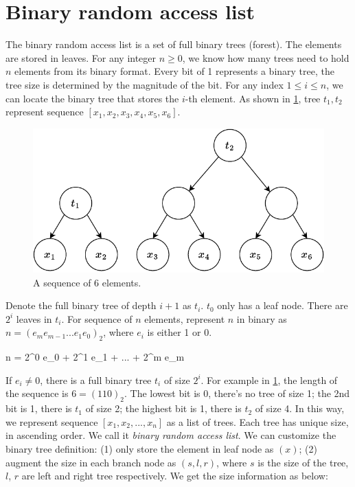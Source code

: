 \documentclass[b5paper]{article}
\begin{document}
\section{Binary random access list}

The binary random access list is a set of full binary trees (forest). The elements are stored in leaves. For any integer $n \geq 0$, we know how many trees need to hold $n$ elements from its binary format. Every bit of 1 represents a binary tree, the tree size is determined by the magnitude of the bit. For any index $1 \leq i \leq n$, we can locate the binary tree that stores the $i$-th element. As shown in \cref{fig:bi-tree-sequence}, tree $t_1, t_2$ represent sequence $[x_1, x_2, x_3, x_4, x_5, x_6]$.

\begin{figure}[htbp]
  \centering
  \includegraphics[scale=0.6]{img/bi-tree-sequence}
  \caption{A sequence of 6 elements.}
  \label{fig:bi-tree-sequence}
\end{figure}

Denote the full binary tree of depth $i + 1$ as $t_i$. $t_0$ only has a leaf node. There are $2^i$ leaves in $t_i$. For sequence of $n$ elements, represent $n$ in binary as $n = (e_m e_{m-1} ... e_1 e_0)_2$, where $e_i$ is either 1 or 0.

\be
n = 2^0 e_0 + 2^1 e_1 + ... + 2^m e_m
\ee

If $e_i \neq 0$, there is a full binary tree $t_i$ of size $2^i$. For example in \cref{fig:bi-tree-sequence}, the length of the sequence is $6 = (110)_2$. The lowest bit is 0, there's no tree of size 1; the 2nd bit is 1, there is $t_1$ of size 2; the highest bit is 1, there is $t_2$ of size 4. In this way, we represent sequence $[x_1, x_2, ..., x_n]$ as a list of trees. Each tree has unique size, in ascending order. We call it {\em binary random access list}\cite{okasaki-book}. We can customize the binary tree definition: (1) only store the element in leaf node as $(x)$; (2) augment the size in each branch node as $(s, l, r)$, where $s$ is the size of the tree, $l$, $r$ are left and right tree respectively. We get the size information as below:
\end{document}

